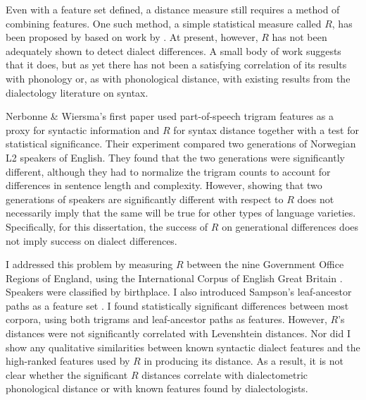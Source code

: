 Even with a feature set defined, a distance measure still requires a
method of combining features. One such method, a simple statistical
measure called $R$, has been proposed by  based
on work by . At present, however, $R$ has not been
adequately shown to detect dialect differences. A small body of work
suggests that it does, but as yet there has not been a satisfying
correlation of its results with phonology or, as with phonological
distance, with existing results from the dialectology literature on
syntax.

Nerbonne \& Wiersma's first paper used part-of-speech trigram features
as a proxy for syntactic information and $R$ for syntax distance
together with a test for statistical significance\cite{nerbonne06}.
Their experiment compared two generations of Norwegian L2 speakers of
English.  They found that the two generations were significantly
different, although they had to normalize the trigram counts to
account for differences in sentence length and complexity. However,
showing that two generations of speakers are significantly different
with respect to $R$ does not necessarily imply that the same will be
true for other types of language varieties. Specifically, for this
dissertation, the success of $R$ on generational differences does not
imply success on dialect differences.

I addressed this problem \cite{sanders08b} by measuring $R$ between
the nine Government Office Regions of England, using the International
Corpus of English Great Britain \cite{nelson02}. Speakers were classified by
birthplace. I also introduced Sampson's leaf-ancestor paths as
a feature set \cite{sampson00}. I found statistically
significant differences between most corpora, using both trigrams and
leaf-ancestor paths as features. However, $R$'s distances were not
significantly correlated with Levenshtein distances. Nor did I
show any qualitative similarities between known syntactic dialect
features and the high-ranked features used by $R$ in producing its
distance. As a result, it is not clear whether the significant $R$ distances
correlate with dialectometric phonological distance or with known
features found by dialectologists.


